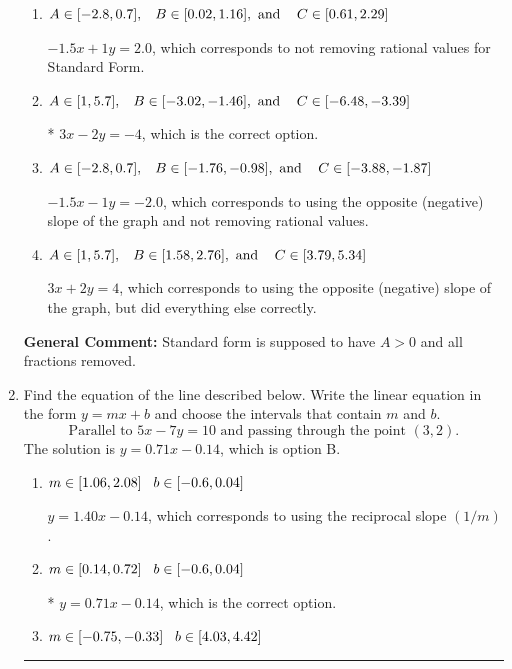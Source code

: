 \documentclass{extbook}[14pt]
\newcommand{\litem}[1]{\item #1

\rule{\textwidth}{0.4pt}}
\begin{document}
\begin{enumerate}
{\begin{enumerate}[label=\Alph*.]
 $-3x + 2y = 4$, which corresponds to not making $A$ positive (by multiplying the equation by $-1$).
\item \( A \in [-2.8, 0.7], \hspace{3mm} B \in [0.02, 1.16], \text{ and } \hspace{3mm} C \in [0.61, 2.29] \)

 $-1.5x + 1y = 2.0$, which corresponds to not removing rational values for Standard Form.
\item \( A \in [1, 5.7], \hspace{3mm} B \in [-3.02, -1.46], \text{ and } \hspace{3mm} C \in [-6.48, -3.39] \)

* $3x - 2y = -4$, which is the correct option.
\item \( A \in [-2.8, 0.7], \hspace{3mm} B \in [-1.76, -0.98], \text{ and } \hspace{3mm} C \in [-3.88, -1.87] \)

 $-1.5x - 1y = -2.0$, which corresponds to using the opposite (negative) slope of the graph and not removing rational values.
\item \( A \in [1, 5.7], \hspace{3mm} B \in [1.58, 2.76], \text{ and } \hspace{3mm} C \in [3.79, 5.34] \)

 $3x + 2y = 4$, which corresponds to using the opposite (negative) slope of the graph, but did everything else correctly.
\end{enumerate}

\textbf{General Comment:} Standard form is supposed to have $A > 0$ and all fractions removed.
}
\litem{
Find the equation of the line described below. Write the linear equation in the form $ y=mx+b $ and choose the intervals that contain $m$ and $b$.
\[ \text{Parallel to } 5 x - 7 y = 10 \text{ and passing through the point } (3, 2). \]The solution is \( y = 0.71x - 0.14 \), which is option B.\begin{enumerate}[label=\Alph*.]
\item \( m \in [1.06, 2.08] \hspace*{3mm} b \in [-0.6, 0.04] \)

 $y = 1.40x - 0.14$, which corresponds to using the reciprocal slope $(1/m)$.
\item \( m \in [0.14, 0.72] \hspace*{3mm} b \in [-0.6, 0.04] \)

* $y = 0.71x - 0.14$, which is the correct option.
\item \( m \in [-0.75, -0.33] \hspace*{3mm} b \in [4.03, 4.42] \)


\end{enumerate}}
\end{enumerate}
\end{document}
